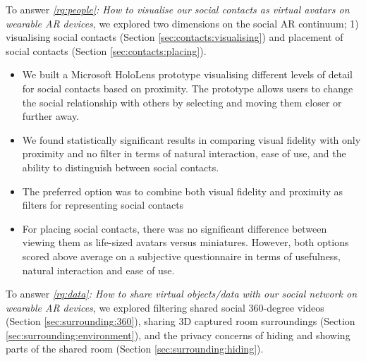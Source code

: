 To answer \textit{\ref{rq:people}: How to visualise our social contacts as virtual avatars on wearable AR devices}, we explored two dimensions on the social AR continuum; 1) visualising social contacts (Section \ref{sec:contacts:visualising}) and placement of social contacts (Section \ref{sec:contacts:placing}). 

\begin{itemize}
    \item{We built a Microsoft HoloLens prototype visualising different levels of detail for social contacts based on proximity. The prototype allows users to change the social relationship with others by selecting and moving them closer or further away.}
    \item{We found statistically significant results in comparing visual fidelity with only proximity and no filter in terms of natural interaction, ease of use, and the ability to distinguish between social contacts.}
    \item{The preferred option was to combine both visual fidelity and proximity as filters for representing social contacts}
    \item{For placing social contacts, there was no significant difference between viewing them as life-sized avatars versus miniatures. However, both options scored above average on a subjective questionnaire in terms of usefulness, natural interaction and ease of use.}
\end{itemize}

To answer \textit{\ref{rq:data}: How to share virtual objects/data with our social network on wearable AR devices}, we explored filtering shared social 360-degree videos (Section \ref{sec:surrounding:360}), sharing 3D captured room surroundings (Section \ref{sec:surrounding:environment}), and the privacy concerns of hiding and showing parts of the shared room (Section \ref{sec:surrounding:hiding}). 


